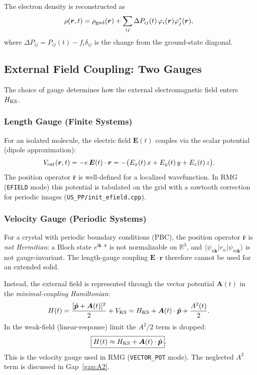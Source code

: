 \documentclass[12pt,letterpaper]{article}
\newcommand{\mel}[3]{\langle #1 \vert #2 \vert #3 \rangle}
\newcommand{\ii}{\mathrm{i}}
\newcommand{\Hks}{H_{\rm KS}}
\begin{document}
The electron density is reconstructed as
\begin{equation}
  \rho(\bm{r},t) = \rho_{\rm gnd}(\bm{r})
  + \sum_{ij} \Delta P_{ij}(t)\,\varphi_i(\bm{r})\varphi_j^*(\bm{r}),
  \label{eq:rho_reconstruct}
\end{equation}
where $\Delta P_{ij} = P_{ij}(t) - f_i\delta_{ij}$ is the change from the
ground-state diagonal.

\subsection{External Field Coupling: Two Gauges}
\label{sec:gauges}

The choice of gauge determines how the external electromagnetic field enters
$\Hks$.

\subsubsection{Length Gauge (Finite Systems)}

For an isolated molecule, the electric field $\bm{E}(t)$ couples via the
scalar potential (dipole approximation):
\begin{equation}
  V_{\rm ext}(\bm{r},t) = -e\,\bm{E}(t)\cdot\bm{r}
  = -\bigl(E_x(t)\,x + E_y(t)\,y + E_z(t)\,z\bigr).
  \label{eq:length_gauge}
\end{equation}
The position operator $\hat{\bm{r}}$ is well-defined for a localized wavefunction.
In RMG (\texttt{EFIELD} mode) this potential is tabulated on the grid with a
sawtooth correction for periodic images (\texttt{US\_PP/init\_efield.cpp}).

\subsubsection{Velocity Gauge (Periodic Systems)}

For a crystal with periodic boundary conditions (PBC), the position operator
$\hat{\bm{r}}$ is \emph{not Hermitian}: a Bloch state $e^{\ii\bm{k}\cdot\bm{r}}$
is not normalizable on $\mathbb{R}^3$, and $\mel{\psi_{n\bm{k}}}{r_\alpha}{\psi_{m\bm{k}}}$
is not gauge-invariant.  The length-gauge coupling $\bm{E}\cdot\bm{r}$ therefore
cannot be used for an extended solid.

Instead, the external field is represented through the vector potential $\bm{A}(t)$
in the \emph{minimal-coupling Hamiltonian}:
\begin{equation}
  H(t) = \frac{[\hat{\bm{p}} + \bm{A}(t)]^2}{2} + V_{\rm KS}
  = H_{\rm KS} + \bm{A}(t)\cdot\hat{\bm{p}}
  + \frac{A^2(t)}{2}.
  \label{eq:minimal_coupling}
\end{equation}
In the weak-field (linear-response) limit the $A^2/2$ term is dropped:
\begin{equation}
  \boxed{H(t) \approx \Hks + \bm{A}(t)\cdot\hat{\bm{p}}}.
  \label{eq:vg_linear}
\end{equation}
This is the velocity gauge used in RMG (\texttt{VECTOR\_POT} mode).  The
neglected $A^2$ term is discussed in Gap~\ref{gap:A2}.
\end{document}

